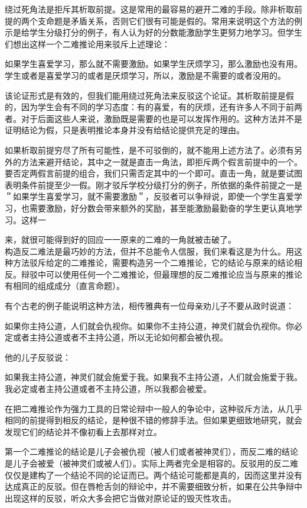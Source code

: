 绕过死角法是拒斥其析取前提。这是常用的最容易的避开二难的手段。除非析取前提的两个支命题是矛盾关系，否则它们很有可能是假的。常用来说明这个方法的例示是给学生分级打分的例子，有人认为好的分数能激励学生更努力地学习。但学生们想出这样一个二难推论用来驳斥上述理论：

如果学生喜爱学习，那么就不需要激励。如果学生厌烦学习，那么激励也没有用。学生或者是喜爱学习的或者是厌烦学习，所以，激励是不需要的或者没用的。

该论证形式是有效的，但我们能用绕过死角法来反驳这个论证。其析取前提是假的，因为学生会有不同的学习态度：有的喜爱，有的厌烦，还有许多人不同于前两者。对于后面这些人来说，激励既是需要的也是可以发挥作用的。这种方法并不是证明结论为假，只是表明推论本身并没有给结论提供充足的理由。

如果析取前提穷尽了所有可能性，是不可驳倒的，就不能用上述方法了。必须有另外的方法来避开结论，其中之一就是直击一角法，即拒斥两个假言前提中的一个。要否定两假言前提的组合，我们只需否定其中的一个即可。直击一角，就是要试图表明条件前提至少一假。刚才驳斥学校分级打分的例子，所依据的条件前提之一是＂如果学生喜爱学习，就不需要激励＂，反驳者可以争辩说，即使一个学生喜爱学习，也需要激励，好分数会带来额外的奖励，甚至能激励最勤奋的学生更认真地学习。这样一

来，就很可能得到好的回应一一原来的二难的一角就被击破了。\\
构造反二难法是最巧妙的方法，但并不总能令人信服，我们来看这是为什么。用这种方法驳斥给定的二难推论，需要构造另一个二难推论，它的结论与原来的结论相反。辩驳中可以使用任何一个二难推论，但最理想的反二难推论应当与原来的推论有相同的组成成分（直言命题）。

有个古老的例子能说明这种方法，相传雅典有一位母亲劝儿子不要从政时说道：

如果你主持公道，人们就会仇视你。如果你不主持公道，神灵们就会仇视你。你必定或者主持公道或者不主持公道，所以无论如何都会被仇视。

他的儿子反驳说：

如果我主持公道，神灵们就会施爱于我。如果我不主持公道，人们就会施爱于我。我必定或者主持公道或者不主持公道，所以我都会被爱。

在把二难推论作为强力工具的日常论辩中一般人的争论中，这种驳斥方法，从几乎相同的前提得到相反的结论，是种很不错的修辞手法。但如果更细致地研究，就会发现它们的结论并不像初看上去那样对立。

第一个二难推论的结论是儿子会被仇视（被人们或者被神灵们），而反二难的结论是儿子会被爱（被神灵们或被人们）。实际上两者完全是相容的。反驳用的反二难仅仅是建构了一个结论不同的论证而已。两个结论可能都是真的，因而这里并没有达成真正的反驳。但在唇枪舌剑的辩论中，并不需要细致分析，如果在公共争辩中出现这样的反驳，听众大多会把它当做对原论证的毁灭性攻击。

